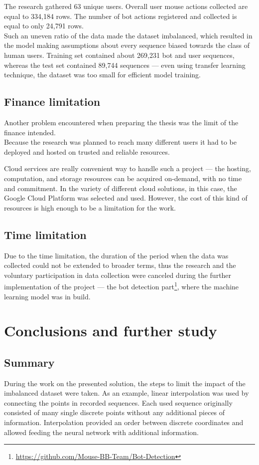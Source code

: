 The research gathered 63 unique users.
Overall user mouse actions collected are equal to 334,184 rows.
The number of bot actions registered and collected is equal to only 24,791 rows.\\
Such an uneven ratio of the data made the dataset imbalanced, which resulted in the model making assumptions about every sequence biased towards the class of human users.
Training set contained about 269,231 bot and user sequences, whereas the test set contained 89,744 sequences --- even using transfer learning technique, the dataset was too small for efficient model training.

\subsection{Finance limitation}\label{subsec:finance-limitation}
Another problem encountered when preparing the thesis was the limit of the finance intended.\\
Because the research was planned to reach many different users it had to be deployed and hosted on trusted and reliable resources.

Cloud services are really convenient way to handle such a project --- the hosting, computation, and storage resources can be acquired on-demand, with no time and commitment.
In the variety of different cloud solutions, in this case, the Google Cloud Platform was selected and used.
However, the cost of this kind of resources is high enough to be a limitation for the work.

\subsection{Time limitation}\label{subsec:time-limitation}
Due to the time limitation, the duration of the period when the data was collected could not be extended to broader terms, thus the research and the voluntary participation in data collection were canceled during the further implementation of the project --- the bot detection part\footnote{\url{https://github.com/Mouse-BB-Team/Bot-Detection}}, where the machine learning model was in build.

\section{Conclusions and further study}\label{sec:conclusions-and-further-study}

\subsection{Summary}\label{subsec:summary}
During the work on the presented solution, the steps to limit the impact of the imbalanced dataset were taken.
As an example, linear interpolation was used by connecting the points in recorded sequences.
Each used sequence originally consisted of many single discrete points without any additional pieces of information.
Interpolation provided an order between discrete coordinates and allowed feeding the neural network with additional information.

